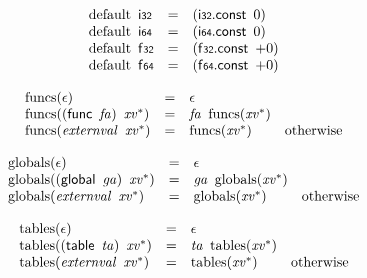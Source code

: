 $$
\begin{array}{@{}lcl@{}l@{}}
{\mathrm{default}}~\,\mathsf{i{\scriptstyle32}} &=& (\mathsf{i{\scriptstyle32}}.\mathsf{const}~\,0) &  \\
{\mathrm{default}}~\,\mathsf{i{\scriptstyle64}} &=& (\mathsf{i{\scriptstyle64}}.\mathsf{const}~\,0) &  \\
{\mathrm{default}}~\,\mathsf{f{\scriptstyle32}} &=& (\mathsf{f{\scriptstyle32}}.\mathsf{const}~\,{+0}) &  \\
{\mathrm{default}}~\,\mathsf{f{\scriptstyle64}} &=& (\mathsf{f{\scriptstyle64}}.\mathsf{const}~\,{+0}) &  \\
\end{array}
$$

\vspace{1ex}

$$
\begin{array}{@{}lcl@{}l@{}}
{\mathrm{funcs}}(\epsilon) &=& \epsilon &  \\
{\mathrm{funcs}}((\mathsf{func}~\,{\mathit{fa}})~\,{{\mathit{xv}}^\ast}) &=& {\mathit{fa}}~\,{\mathrm{funcs}}({{\mathit{xv}}^\ast}) &  \\
{\mathrm{funcs}}({\mathit{externval}}~\,{{\mathit{xv}}^\ast}) &=& {\mathrm{funcs}}({{\mathit{xv}}^\ast}) &\quad
  \mbox{otherwise} \\
\end{array}
$$

$$
\begin{array}{@{}lcl@{}l@{}}
{\mathrm{globals}}(\epsilon) &=& \epsilon &  \\
{\mathrm{globals}}((\mathsf{global}~\,{\mathit{ga}})~\,{{\mathit{xv}}^\ast}) &=& {\mathit{ga}}~\,{\mathrm{globals}}({{\mathit{xv}}^\ast}) &  \\
{\mathrm{globals}}({\mathit{externval}}~\,{{\mathit{xv}}^\ast}) &=& {\mathrm{globals}}({{\mathit{xv}}^\ast}) &\quad
  \mbox{otherwise} \\
\end{array}
$$

$$
\begin{array}{@{}lcl@{}l@{}}
{\mathrm{tables}}(\epsilon) &=& \epsilon &  \\
{\mathrm{tables}}((\mathsf{table}~\,{\mathit{ta}})~\,{{\mathit{xv}}^\ast}) &=& {\mathit{ta}}~\,{\mathrm{tables}}({{\mathit{xv}}^\ast}) &  \\
{\mathrm{tables}}({\mathit{externval}}~\,{{\mathit{xv}}^\ast}) &=& {\mathrm{tables}}({{\mathit{xv}}^\ast}) &\quad
  \mbox{otherwise} \\
\end{array}
$$

